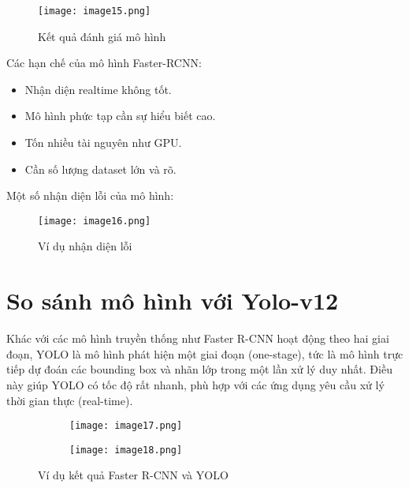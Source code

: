 \documentclass{article}
\begin{document}
\begin{figure}[H]
    \centering
    \texttt{[image: image15.png]}
    \caption{Kết quả đánh giá mô hình}
\end{figure}

Các hạn chế của mô hình Faster-RCNN:
\begin{itemize}
    \item Nhận diện realtime không tốt.
    \item Mô hình phức tạp cần sự hiểu biết cao.
    \item Tốn nhiều tài nguyên như GPU.
    \item Cần số lượng dataset lớn và rõ.
\end{itemize}

Một số nhận diện lỗi của mô hình:
\begin{figure}[H]
    \centering
    \texttt{[image: image16.png]}
    \caption{Ví dụ nhận diện lỗi}
\end{figure}

\section{So sánh mô hình với Yolo-v12}
Khác với các mô hình truyền thống như Faster R-CNN hoạt động theo hai giai đoạn, YOLO là mô hình phát hiện một giai đoạn (one-stage), tức là mô hình trực tiếp dự đoán các bounding box và nhãn lớp trong một lần xử lý duy nhất. Điều này giúp YOLO có tốc độ rất nhanh, phù hợp với các ứng dụng yêu cầu xử lý thời gian thực (real-time).

\begin{figure}[H]
    \begin{subfigure}{0.45\textwidth}
        \centering
        \texttt{[image: image17.png]}
    \end{subfigure}
    \hfill
    \begin{subfigure}{0.45\textwidth}
        \centering
        \texttt{[image: image18.png]}
    \end{subfigure}
    \caption{Ví dụ kết quả Faster R-CNN và YOLO}
\end{figure}
\end{document}
